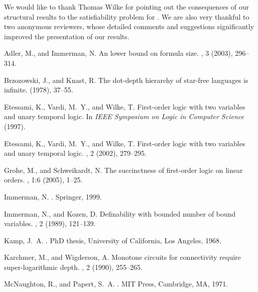 \documentclass{LMCS}
\begin{document}
We would like to thank Thomas Wilke for pointing out the consequences of our
structural results to the satisfiability problem for . We are
also very thankful to two anonymous reviewers, whose detailed comments and
suggestions significantly improved the presentation of our results.

\begin{thebibliography}{10}

{\sc Adler, M., and Immerman, N.}
\newblock An  lower bound on formula size.
, 3 (2003), 296--314.

{\sc Brzozowski, J., and Knast, R.}
\newblock The dot-depth hierarchy of star-free languages is infinite.
 (1978), 37--55.

{\sc Etessami, K., Vardi, M.~Y., and Wilke, T.}
\newblock First-order logic with two variables and unary temporal logic.
\newblock In {\em I{EEE} {S}ymposium on {L}ogic in {C}omputer {S}cience\/}
  (1997).

{\sc Etessami, K., Vardi, M.~Y., and Wilke, T.}
\newblock First-order logic with two variables and unary temporal logic.
, 2 (2002), 279--295.

{\sc Grohe, M., and Schweikardt, N.}
\newblock The succinctness of first-order logic on linear orders.
, 1:6 (2005), 1--25.

{\sc Immerman, N.}
.
\newblock Springer, 1999.

{\sc Immerman, N., and Kozen, D.}
\newblock Definability with bounded number of bound variables.
, 2 (1989), 121--139.

{\sc Kamp, J.~A.}
.
\newblock PhD thesis, University of California, Los Angeles, 1968.

{\sc Karchmer, M., and Wigderson, A.}
\newblock Monotone circuits for connectivity require super-logarithmic depth.
, 2 (1990), 255--265.

{\sc McNaughton, R., and Papert, S.~A.}
.
\newblock MIT Press, Cambridge, MA, 1971.


\end{thebibliography}
\end{document}
